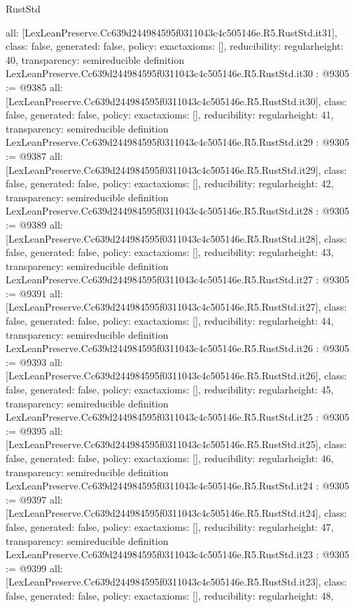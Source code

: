 \begin{lexlean}{RustStd}
\begin{coremodule}
{  all: [LexLeanPreserve.Cc639d244984595f0311043c4c505146e.R5.RustStd.it31],
  class: false,
  generated: false,
  policy: exact{axioms: []},
  reducibility: regular{height: 40},
  transparency: semireducible
}
definition LexLeanPreserve.Cc639d244984595f0311043c4c505146e.R5.RustStd.it30 : @9305 := @9385 {
  all: [LexLeanPreserve.Cc639d244984595f0311043c4c505146e.R5.RustStd.it30],
  class: false,
  generated: false,
  policy: exact{axioms: []},
  reducibility: regular{height: 41},
  transparency: semireducible
}
definition LexLeanPreserve.Cc639d244984595f0311043c4c505146e.R5.RustStd.it29 : @9305 := @9387 {
  all: [LexLeanPreserve.Cc639d244984595f0311043c4c505146e.R5.RustStd.it29],
  class: false,
  generated: false,
  policy: exact{axioms: []},
  reducibility: regular{height: 42},
  transparency: semireducible
}
definition LexLeanPreserve.Cc639d244984595f0311043c4c505146e.R5.RustStd.it28 : @9305 := @9389 {
  all: [LexLeanPreserve.Cc639d244984595f0311043c4c505146e.R5.RustStd.it28],
  class: false,
  generated: false,
  policy: exact{axioms: []},
  reducibility: regular{height: 43},
  transparency: semireducible
}
definition LexLeanPreserve.Cc639d244984595f0311043c4c505146e.R5.RustStd.it27 : @9305 := @9391 {
  all: [LexLeanPreserve.Cc639d244984595f0311043c4c505146e.R5.RustStd.it27],
  class: false,
  generated: false,
  policy: exact{axioms: []},
  reducibility: regular{height: 44},
  transparency: semireducible
}
definition LexLeanPreserve.Cc639d244984595f0311043c4c505146e.R5.RustStd.it26 : @9305 := @9393 {
  all: [LexLeanPreserve.Cc639d244984595f0311043c4c505146e.R5.RustStd.it26],
  class: false,
  generated: false,
  policy: exact{axioms: []},
  reducibility: regular{height: 45},
  transparency: semireducible
}
definition LexLeanPreserve.Cc639d244984595f0311043c4c505146e.R5.RustStd.it25 : @9305 := @9395 {
  all: [LexLeanPreserve.Cc639d244984595f0311043c4c505146e.R5.RustStd.it25],
  class: false,
  generated: false,
  policy: exact{axioms: []},
  reducibility: regular{height: 46},
  transparency: semireducible
}
definition LexLeanPreserve.Cc639d244984595f0311043c4c505146e.R5.RustStd.it24 : @9305 := @9397 {
  all: [LexLeanPreserve.Cc639d244984595f0311043c4c505146e.R5.RustStd.it24],
  class: false,
  generated: false,
  policy: exact{axioms: []},
  reducibility: regular{height: 47},
  transparency: semireducible
}
definition LexLeanPreserve.Cc639d244984595f0311043c4c505146e.R5.RustStd.it23 : @9305 := @9399 {
  all: [LexLeanPreserve.Cc639d244984595f0311043c4c505146e.R5.RustStd.it23],
  class: false,
  generated: false,
  policy: exact{axioms: []},
  reducibility: regular{height: 48},
}
\end{coremodule}
\end{lexlean}
